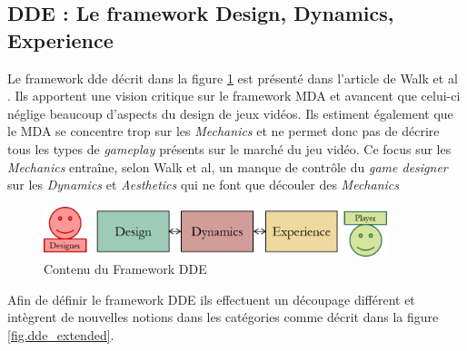 \subsection{DDE : Le framework Design, Dynamics, Experience \cite{DDE}}

Le framework \gls{dde} décrit dans la figure \ref{fig.dde} est présenté dans l'article de Walk et al \cite{DDE}. Ils apportent une vision critique sur le framework MDA et avancent que celui-ci néglige beaucoup d'aspects du design de jeux vidéos. Ils estiment également que le MDA se concentre trop sur les \emph{Mechanics} et ne permet donc pas de décrire tous les types de \emph{gameplay} présents sur le marché du jeu vidéo. Ce focus sur les \emph{Mechanics} entraîne, selon Walk et al, un manque de contrôle du \emph{game designer} sur les \emph{Dynamics} et \emph{Aesthetics} qui ne font que découler des \emph{Mechanics}

\begin{figure}[H]
    \begin{center}
    \includegraphics[width=10cm]{10_img/chap3/dde.png} 
    \caption{Contenu du Framework DDE \cite{DDE}}
    \label{fig.dde}
    \end{center}
\end{figure}

Afin de définir le framework DDE ils effectuent un découpage différent et intègrent de nouvelles notions dans les catégories comme décrit dans la figure \ref{fig.dde_extended}.

